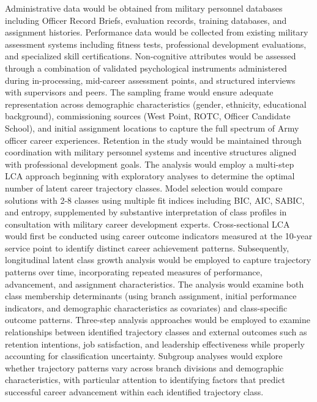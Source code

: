 \documentclass[main.tex]{subfiles}
\begin{document}
Administrative data would be obtained from military personnel databases including Officer Record Briefs, evaluation records, training databases, and assignment histories. Performance data would be collected from existing military assessment systems including fitness tests, professional development evaluations, and specialized skill certifications. Non-cognitive attributes would be assessed through a combination of validated psychological instruments administered during in-processing, mid-career assessment points, and structured interviews with supervisors and peers.
The sampling frame would ensure adequate representation across demographic characteristics (gender, ethnicity, educational background), commissioning sources (West Point, ROTC, Officer Candidate School), and initial assignment locations to capture the full spectrum of Army officer career experiences. Retention in the study would be maintained through coordination with military personnel systems and incentive structures aligned with professional development goals.
The analysis would employ a multi-step LCA approach beginning with exploratory analyses to determine the optimal number of latent career trajectory classes. Model selection would compare solutions with 2-8 classes using multiple fit indices including BIC, AIC, SABIC, and entropy, supplemented by substantive interpretation of class profiles in consultation with military career development experts.
Cross-sectional LCA would first be conducted using career outcome indicators measured at the 10-year service point to identify distinct career achievement patterns. Subsequently, longitudinal latent class growth analysis would be employed to capture trajectory patterns over time, incorporating repeated measures of performance, advancement, and assignment characteristics. The analysis would examine both class membership determinants (using branch assignment, initial performance indicators, and demographic characteristics as covariates) and class-specific outcome patterns.
Three-step analysis approaches would be employed to examine relationships between identified trajectory classes and external outcomes such as retention intentions, job satisfaction, and leadership effectiveness while properly accounting for classification uncertainty. Subgroup analyses would explore whether trajectory patterns vary across branch divisions and demographic characteristics, with particular attention to identifying factors that predict successful career advancement within each identified trajectory class.
\end{document}
